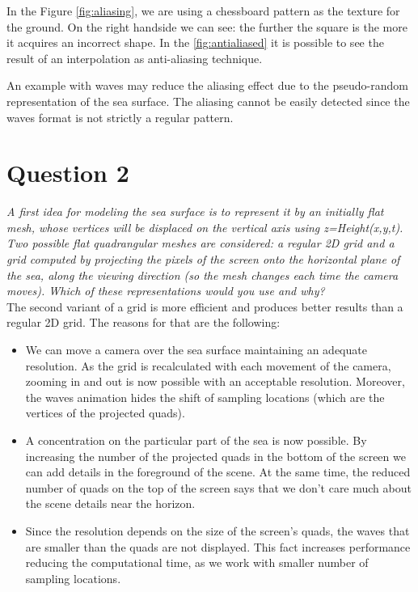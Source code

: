 \documentclass{article}
\begin{document}
In the Figure \ref{fig:aliasing}, we are using a chessboard pattern as the texture for the ground. On the right handside we can see: the further the square is the more it acquires an incorrect shape. In the \ref{fig:antialiased} it is possible to see the result of an interpolation as anti-aliasing technique.	

An example with waves may reduce the aliasing effect due to the pseudo-random representation of the sea surface. The aliasing cannot be easily detected since the waves format is not strictly a regular pattern.


\section{Question 2}

\emph{A first idea for modeling the sea surface is to represent it by an
initially flat mesh, whose vertices will be displaced on the vertical
axis using z=Height(x,y,t). Two possible flat quadrangular meshes are
considered: a regular 2D grid and a grid computed by projecting the
pixels of the screen onto the horizontal plane of the sea, along the
viewing direction (so the mesh changes each time the camera moves).
Which of these representations would you use and why?}\\

The second variant of a grid is more efficient and produces better
results than a regular 2D grid. The reasons for that are the following\cite{iaow}:

\begin{itemize}

  \item We can move a camera over the sea surface maintaining an
    adequate resolution. As the grid is recalculated with each movement of
    the camera, zooming in and out is now possible with an acceptable
    resolution. Moreover, the waves animation hides the shift of sampling
    locations (which are the vertices of the projected quads).

  \item A concentration on the particular part of the sea is now
    possible. By increasing the number of the projected quads in
    the bottom of the screen we can add details in the foreground of the
    scene. At the same time, the reduced number of quads on the top of
    the screen says that we don't care much about the scene details
    near the horizon.

  \item Since the resolution depends on the size of the screen's quads,
    the waves that are smaller than the quads are not displayed. This
    fact increases performance reducing the computational time, as we
    work with smaller number of sampling locations.

\end{itemize}
\end{document}
